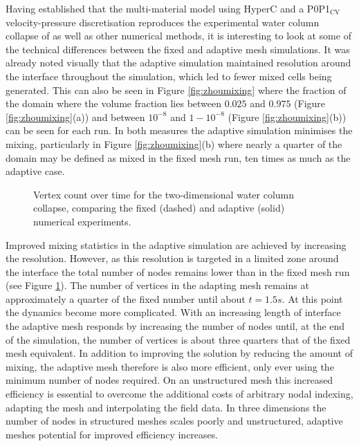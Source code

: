 Having established that the multi-material model using HyperC and a P0P1$_{\text{CV}}$ velocity-pressure discretisation reproduces the experimental water column collapse of \citet{zhou_nonlinear_1999} as well as other numerical methods, it is interesting to look at some of the technical differences between the fixed and adaptive mesh simulations.  It was already noted visually that the adaptive simulation maintained resolution around the interface throughout the simulation, which led to fewer mixed cells being generated.  This can also be seen in Figure \ref{fig:zhoumixing} where the fraction of the domain where the volume fraction lies between $0.025$ and $0.975$ (Figure \ref{fig:zhoumixing}(a)) and between $10^{-8}$ and $1-10^{-8}$ (Figure \ref{fig:zhoumixing}(b)) can be seen for each run.  In both measures the adaptive simulation minimises the mixing, particularly in Figure \ref{fig:zhoumixing}(b) where nearly a quarter of the domain may be defined as mixed in the fixed mesh run, ten times as much as the adaptive case.

\begin{figure}[btp]
\begin{center}

\caption{Vertex count over time for the two-dimensional water column collapse, comparing the fixed (dashed) and adaptive (solid) numerical experiments.}
\label{fig:zhounodes}
\end{center}
\end{figure}

Improved mixing statistics in the adaptive simulation are achieved by increasing the resolution.  However, as this resolution is targeted in a limited zone around the interface the total number of nodes remains lower than in the fixed mesh run (see Figure \ref{fig:zhounodes}).  The number of vertices in the adapting mesh remains at approximately a quarter of the fixed number until about $t=1.5s$.  At this point the dynamics become more complicated.  With an increasing length of interface the adaptive mesh responds by increasing the number of nodes until, at the end of the simulation, the number of vertices is about three quarters that of the fixed mesh equivalent.  In addition to improving the solution by reducing the amount of mixing, the adaptive mesh therefore is also more efficient, only ever using the minimum number of nodes required.  On an unstructured mesh this increased efficiency is essential to overcome the additional costs of arbitrary nodal indexing, adapting the mesh and interpolating the field data.  In three dimensions the number of nodes in structured meshes scales poorly and unstructured, adaptive meshes potential for improved efficiency increases.

